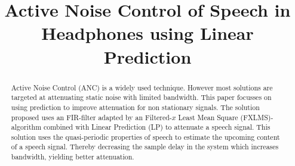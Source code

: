 \documentclass[conference]{IEEEtran}
\begin{document}
\title{Active Noise Control of Speech in Headphones using Linear Prediction}

\author{
}

\maketitle

\begin{abstract}
Active Noise Control (ANC) is a widely used technique. However most solutions are targeted at attenuating static noise with limited bandwidth. This paper focusses on using prediction to improve attenuation for non stationary signals.
The solution proposed uses an FIR-filter adapted by an Filtered-$x$ Least Mean Square (FXLMS)-algorithm combined with Linear Prediction (LP) to attenuate a speech signal. This solution uses the quasi-periodic properties of speech to estimate the upcoming content of a speech signal. Thereby decreasing the sample delay in the system which increases bandwidth, yielding better attenuation.
\end{abstract}

\IEEEpeerreviewmaketitle












\end{document}
